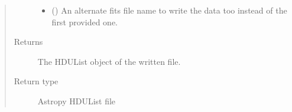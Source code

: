 \documentclass[letterpaper,10pt,english]{sphinxmanual}
\begin{document}
\begin{fulllineitems}
\begin{quote}
\begin{description}
\begin{itemize}
\item {} 
 (\sphinxstyleliteralemphasis{\sphinxupquote{ (}}\sphinxstyleliteralemphasis{\sphinxupquote{)}}) \textendash{} An alternate fits file name to write the data too instead of the
first provided one.

\end{itemize}

\item[{Returns}] \leavevmode
{} \textendash{} The HDUList object of the written file.

\item[{Return type}] \leavevmode
Astropy HDUList file

\end{description}\end{quote}

\end{fulllineitems}

\end{document}
